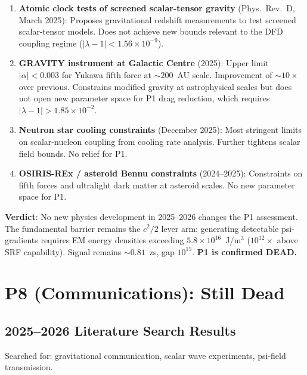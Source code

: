 \documentclass[11pt]{article}
\newcommand{\ee}[1]{\times 10^{#1}}
\newcommand{\lamdiff}{|\lambda{-}1|}
\begin{document}
\begin{enumerate}[nosep]
\item \textbf{Atomic clock tests of screened scalar-tensor gravity}
  (Phys.\ Rev.\ D, March 2025): Proposes gravitational redshift
  measurements to test screened scalar-tensor models. Does not achieve
  new bounds relevant to the DFD coupling regime ($\lamdiff < 1.56\ee{-9}$).

\item \textbf{GRAVITY instrument at Galactic Centre} (2025): Upper limit
  $|\alpha| < 0.003$ for Yukawa fifth force at $\sim 200$~AU scale.
  Improvement of $\sim 10\times$ over previous. Constrains modified
  gravity at astrophysical scales but does not open new parameter space
  for P1 drag reduction, which requires $\lamdiff > 1.85\ee{-2}$.

\item \textbf{Neutron star cooling constraints} (December 2025): Most
  stringent limits on scalar-nucleon coupling from cooling rate analysis.
  Further tightens scalar field bounds. No relief for P1.

\item \textbf{OSIRIS-REx / asteroid Bennu constraints} (2024--2025):
  Constraints on fifth forces and ultralight dark matter at asteroid
  scales. No new parameter space for P1.
\end{enumerate}

\textbf{Verdict}: No new physics development in 2025--2026 changes
the P1 assessment. The fundamental barrier remains the $c^2/2$ lever
arm: generating detectable psi-gradients requires EM energy densities
exceeding $5.8\ee{16}$~J/m$^3$ ($10^{12}\times$ above SRF capability).
Signal remains $\sim 0.81$~zs, gap $10^{15}$.
\textbf{P1 is confirmed DEAD.}


\section{P8 (Communications): Still Dead}

\subsection{2025--2026 Literature Search Results}

Searched for: gravitational communication, scalar wave experiments,
psi-field transmission.
\end{document}
